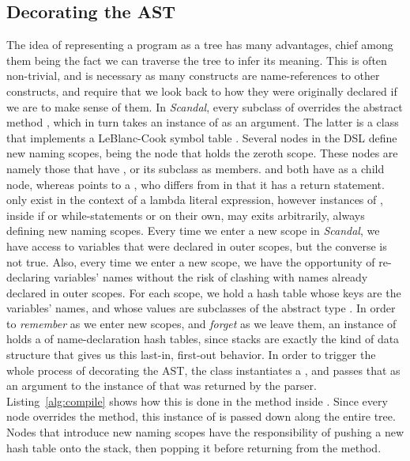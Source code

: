 
\subsection{Decorating the AST}

The idea of representing a program as a tree has many advantages, chief among them being the fact we can traverse the tree to infer its meaning. This is often non-trivial, and is necessary as many constructs are name-references to other constructs, and require that we look back to how they were originally declared if we are to make sense of them. In \emph{Scandal}, every subclass of  overrides the abstract method , which in turn takes an instance of  as an argument. The latter is a class that implements a LeBlanc-Cook symbol table \cite{Cook1983}. Several nodes in the DSL define new naming scopes,  being the node that holds the zeroth scope. These nodes are namely those that have , or its subclass  as members.  and  both have  as a child node, whereas  points to a , who differs from  in that it has a return statement.  only exist in the context of a lambda literal expression, however instances of , inside if or while-statements or on their own, may exits arbitrarily, always defining new naming scopes. Every time we enter a new scope in \emph{Scandal}, we have access to variables that were declared in outer scopes, but the converse is not true. Also, every time we enter a new scope, we have the opportunity of re-declaring variables' names without the risk of clashing with names already declared in outer scopes. For each scope, we hold a hash table whose keys are the variables' names, and whose values are subclasses of the abstract type . In order to \emph{remember} as we enter new scopes, and \emph{forget} as we leave them, an instance of  holds a  of name-declaration hash tables, since stacks are exactly the kind of data structure that gives us this last-in, first-out behavior. In order to trigger the whole process of decorating the AST, the  class instantiates a , and passes that as an argument to the instance of  that was returned by the parser. Listing~\ref{alg:compile} shows how this is done in the  method inside . Since every node overrides the  method, this instance of  is passed down along the entire tree. Nodes that introduce new naming scopes have the responsibility of pushing a new hash table onto the stack, then popping it before returning from the  method.

